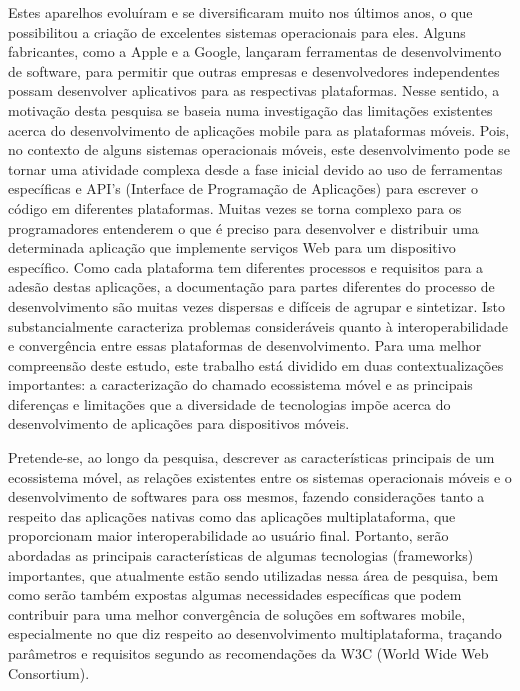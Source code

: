 Estes aparelhos evoluíram e se diversificaram muito nos últimos anos, o que possibilitou a criação de
excelentes sistemas operacionais para eles. Alguns fabricantes, como a Apple e a Google, lançaram
ferramentas de desenvolvimento de software, para permitir que outras empresas e desenvolvedores
independentes possam desenvolver aplicativos para as respectivas plataformas.
Nesse sentido, a motivação desta pesquisa se baseia numa investigação das limitações existentes
acerca do desenvolvimento de aplicações mobile para as plataformas móveis. Pois, no contexto de alguns
sistemas operacionais móveis, este desenvolvimento pode se tornar uma atividade complexa desde a fase
inicial devido ao uso de ferramentas específicas e API’s (Interface de Programação de Aplicações) para
escrever o código em diferentes plataformas. Muitas vezes se torna complexo para os programadores
entenderem o que é preciso para desenvolver e distribuir uma determinada aplicação que implemente
serviços Web para um dispositivo específico. Como cada plataforma tem diferentes processos e requisitos
para a adesão destas aplicações, a documentação para partes diferentes do processo de desenvolvimento são
muitas vezes dispersas e difíceis de agrupar e sintetizar. Isto substancialmente caracteriza problemas
consideráveis quanto à interoperabilidade e convergência entre essas plataformas de desenvolvimento. Para
uma melhor compreensão deste estudo, este trabalho está dividido em duas contextualizações importantes: a
caracterização do chamado ecossistema móvel e as principais diferenças e limitações que a diversidade de
tecnologias impõe acerca do desenvolvimento de aplicações para dispositivos móveis.

Pretende-se, ao longo da pesquisa, descrever as características principais de um ecossistema móvel, as
relações existentes entre os sistemas operacionais móveis e o desenvolvimento de softwares para oss
mesmos, fazendo considerações tanto a respeito das aplicações nativas como das aplicações
multiplataforma, que proporcionam maior interoperabilidade ao usuário final. Portanto, serão abordadas as
principais características de algumas tecnologias (frameworks) importantes, que atualmente estão sendo
utilizadas nessa área de pesquisa, bem como serão também expostas algumas necessidades específicas que
podem contribuir para uma melhor convergência de soluções em softwares mobile, especialmente no que diz
respeito ao desenvolvimento multiplataforma, traçando parâmetros e requisitos segundo as recomendações
da W3C (World Wide Web Consortium).





